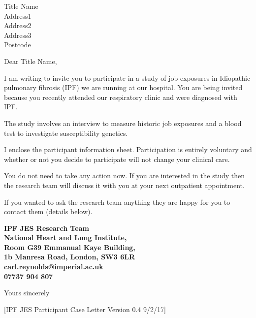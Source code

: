 \documentclass[ipfjes-centre,letterpaper,pagesize,UScommercial9]{scrlttr2}
\begin{document}
\begin{letter}{Title Name \\ Address1 \\ Address2 \\ Address3 \\ Postcode}


\opening{Dear Title Name,}

     I am writing to invite you to participate in a study of job exposures in Idiopathic pulmonary fibrosis (IPF) we are running at our hospital. You are being invited because you recently attended our respiratory clinic and were diagnosed with IPF. 
     
     The study involves an interview to measure historic job exposures and a blood test to investigate susceptibility genetics. 
     
    I enclose the participant information sheet. Participation is entirely voluntary and whether or not you decide to participate will not change your clinical care. 
    
    You do not need to take any action now. If you are interested in the study then the research team will discuss it with you at your next outpatient appointment.

    If you wanted to ask the research team anything they are happy for you to contact them (details below).

    \vspace{1cm}
    \begin{centering}
    \textbf{
    IPF JES Research Team \\  
    National Heart and Lung Institute, \\
    Room G39 Emmanual Kaye Building, \\
    1b Manresa Road, London, SW3 6LR\\
    carl.reynolds@imperial.ac.uk \\
    07737 904 807 \\
    }
    \end{centering}
    \vspace{1cm}

\closing{Yours sincerely}

     \vfill \hfill [IPF JES Participant Case Letter Version 0.4 9/2/17]


\end{letter}
\end{document}
